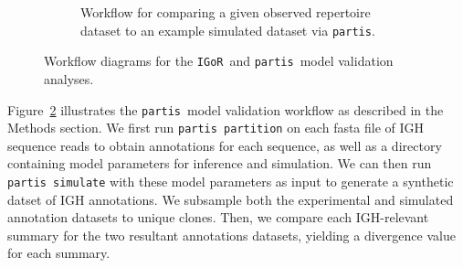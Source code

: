\documentclass{article}
\newcommand{\partis}{\texttt{partis}}
\newcommand{\igor}{\texttt{IGoR}}
\begin{document}
\begin{figure}
\begin{subfigure}{0.5\textwidth}
    \end{subfigure}
    \begin{subfigure}{0.5\textwidth}
    \begin{adjustbox}{max totalsize={\textwidth}{.5\textheight},center}
    \end{adjustbox}
    \caption{Workflow for comparing a given observed repertoire dataset to an example simulated dataset via \partis.}
    \label{fig:PartisWorkflow}
    \end{subfigure}
    \caption{Workflow diagrams for the \igor\ and \partis\ model validation analyses.}
\end{figure}
Figure~\ref{fig:PartisWorkflow} illustrates the \partis\ model validation workflow as described in the Methods section.
We first run \texttt{partis partition} on each fasta file of IGH sequence reads to obtain annotations for each sequence, as well as a directory containing model parameters for inference and simulation.
We can then run \texttt{partis simulate} with these model parameters as input to generate a synthetic datset of IGH annotations.
We subsample both the experimental and simulated annotation datasets to unique clones.
Then, we compare each IGH-relevant summary for the two resultant annotations datasets, yielding a divergence value for each summary.
\end{document}
